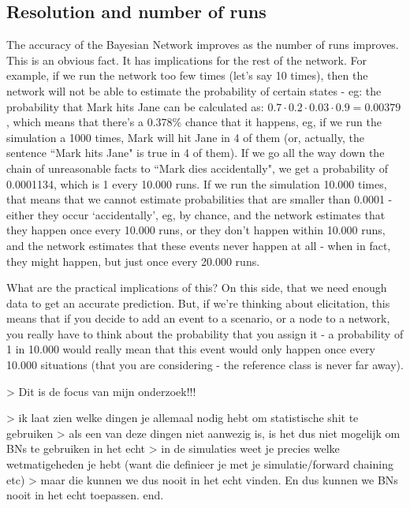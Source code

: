 \subsection{Resolution and number of runs}
The accuracy of the Bayesian Network improves as the number of runs improves. This is an obvious fact. It has implications for the rest of the network. For example, if we run the network too few times (let's say 10 times), then the network will not be able to estimate the probability of certain states - eg: the probability that Mark hits Jane can be calculated as: $0.7 \cdot 0.2 \cdot 0.03 \cdot 0.9 = 0.00379$, which means that there's a 0.378\% chance that it happens, eg, if we run the simulation a 1000 times, Mark will hit Jane in 4 of them (or, actually, the sentence ``Mark hits Jane" is true in 4 of them). If we go all the way down the chain of unreasonable facts to ``Mark dies accidentally", we get a probability of 0.0001134, which is 1 every 10.000 runs. If we run the simulation 10.000 times, that means that we cannot estimate probabilities that are smaller than 0.0001 - either they occur `accidentally', eg, by chance, and the network estimates that they happen once every 10.000 runs, or they don't happen within 10.000 runs, and the network estimates that these events never happen at all - when in fact, they might happen, but just once every 20.000 runs.

What are the practical implications of this? On this side, that we need enough data to get an accurate prediction. But, if we're thinking about elicitation, this means that if you decide to add an event to a scenario, or a node to a network, you really have to think about the probability that you assign it - a probability of 1 in 10.000 would really mean that this event would only happen once every 10.000 situations (that you are considering - the reference class is never far away). 



> Dit is de focus van mijn onderzoek!!!

> ik laat zien welke dingen je allemaal nodig hebt om statistische shit te gebruiken
> als een van deze dingen niet aanwezig is, is het dus niet mogelijk om BNs te gebruiken in het echt
> in de simulaties weet je precies welke wetmatigeheden je hebt (want die definieer je met je simulatie/forward chaining etc)
> maar die kunnen we dus nooit in het echt vinden. En dus kunnen we BNs nooit in het echt toepassen. end.


